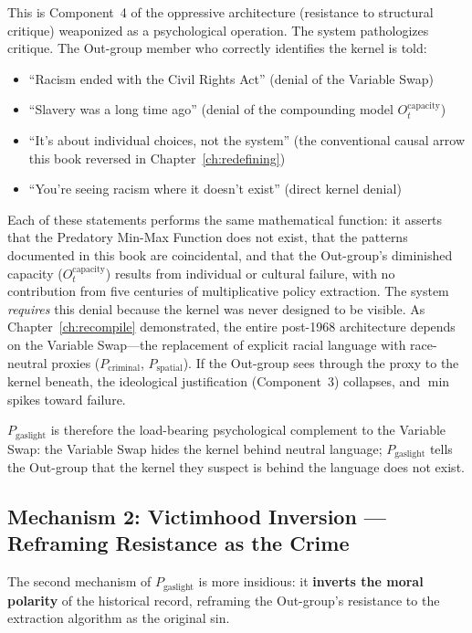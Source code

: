 This is Component~4 of the oppressive architecture (resistance to structural critique) weaponized as a psychological operation. The system pathologizes critique. The Out-group member who correctly identifies the kernel is told:
\begin{itemize}
    \item ``Racism ended with the Civil Rights Act'' (denial of the Variable Swap)
    \item ``Slavery was a long time ago'' (denial of the compounding model $O_t^{\text{capacity}}$)
    \item ``It's about individual choices, not the system'' (the conventional causal arrow this book reversed in Chapter~\ref{ch:redefining})
    \item ``You're seeing racism where it doesn't exist'' (direct kernel denial)
\end{itemize}

Each of these statements performs the same mathematical function: it asserts that the Predatory Min-Max Function does not exist, that the patterns documented in this book are coincidental, and that the Out-group's diminished capacity ($O_t^{\text{capacity}}$) results from individual or cultural failure, with no contribution from five centuries of multiplicative policy extraction. The system \textit{requires} this denial because the kernel was never designed to be visible. As Chapter~\ref{ch:recompile} demonstrated, the entire post-1968 architecture depends on the Variable Swap---the replacement of explicit racial language with race-neutral proxies ($P_{\text{criminal}}$, $P_{\text{spatial}}$). If the Out-group sees through the proxy to the kernel beneath, the ideological justification (Component~3) collapses, and $\min$ spikes toward failure.

$P_{\text{gaslight}}$ is therefore the load-bearing psychological complement to the Variable Swap: the Variable Swap hides the kernel behind neutral language; $P_{\text{gaslight}}$ tells the Out-group that the kernel they suspect is behind the language does not exist.

\subsection{Mechanism 2: Victimhood Inversion --- Reframing Resistance as the Crime}

The second mechanism of $P_{\text{gaslight}}$ is more insidious: it \textbf{inverts the moral polarity} of the historical record, reframing the Out-group's resistance to the extraction algorithm as the original sin.

